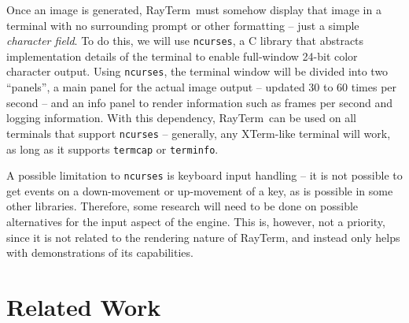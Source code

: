 \documentclass[11pt]{article}
\newcommand{\name}{{\sc RayTerm}}
\begin{document}
Once an image is generated, \name\ must somehow display that image in a terminal with no surrounding prompt or other formatting -- just a simple {\it character field}.
To do this, we will use \texttt{ncurses}, a C library that abstracts implementation details of the terminal to enable full-window 24-bit color character output.
Using \texttt{ncurses}, the terminal window will be divided into two ``panels'', a main panel for the actual image output -- updated 30 to 60 times per second -- and an info panel to render information such as frames per second and logging information.
With this dependency, \name\ can be used on all terminals that support \texttt{ncurses} -- generally, any XTerm-like terminal will work, as long as it supports \texttt{termcap} or \texttt{terminfo}.

A possible limitation to \texttt{ncurses} is keyboard input handling -- it is not possible to get events on a down-movement or up-movement of a key, as is possible in some other libraries.
Therefore, some research will need to be done on possible alternatives for the input aspect of the engine.
This is, however, not a priority, since it is not related to the rendering nature of \name, and instead only helps with demonstrations of its capabilities.

\section{Related Work}
\label{sec:relatedwork}


\end{document}
